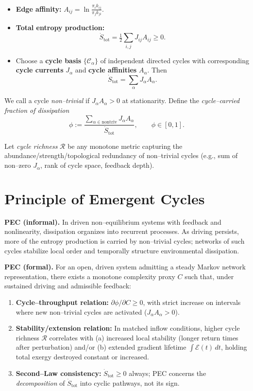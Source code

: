 \documentclass[12pt,a4paper]{article}
\begin{document}
\begin{itemize}
\item \textbf{Edge affinity:} $A_{ij} = \ln \frac{\pi_i k_{ij}}{\pi_j k_{ji}}$.
\item \textbf{Total entropy production:}
\[
\dot S_{\mathrm{tot}} = \tfrac{1}{2} \sum_{i,j} J_{ij} A_{ij} \ge 0.
\]
\item Choose a \textbf{cycle basis} $\{\mathcal{C}_\alpha\}$ of independent directed cycles with corresponding \textbf{cycle currents} $J_\alpha$ and \textbf{cycle affinities} $A_\alpha$. Then
\[
\dot S_{\mathrm{tot}} = \sum_{\alpha} J_\alpha A_\alpha.
\]
\end{itemize}

We call a cycle \emph{non--trivial} if $J_\alpha A_\alpha > 0$ at stationarity. Define the \emph{cycle--carried fraction of dissipation}
\[
\phi := \frac{\sum_{\alpha \in \mathrm{nontriv}} J_\alpha A_\alpha}{\dot S_{\mathrm{tot}}}, \qquad \phi \in [0,1].
\]

Let \emph{cycle richness} $\mathcal{R}$ be any monotone metric capturing the abundance/strength/topological redundancy of non--trivial cycles (e.g., sum of non--zero $J_\alpha$, rank of cycle space, feedback depth).

\section{Principle of Emergent Cycles}
\textbf{PEC (informal).} In driven non--equilibrium systems with feedback and nonlinearity, dissipation organizes into recurrent processes. As driving persists, more of the entropy production is carried by non--trivial cycles; networks of such cycles stabilize local order and temporally structure environmental dissipation.

\textbf{PEC (formal).} For an open, driven system admitting a steady Markov network representation, there exists a monotone complexity proxy $C$ such that, under sustained driving and admissible feedback:
\begin{enumerate}
\item \textbf{Cycle--throughput relation:} $\partial \phi / \partial C \ge 0$, with strict increase on intervals where new non--trivial cycles are activated ($J_\alpha A_\alpha > 0$).
\item \textbf{Stability/extension relation:} In matched inflow conditions, higher cycle richness $\mathcal{R}$ correlates with (a) increased local stability (longer return times after perturbation) and/or (b) extended gradient lifetime $\int \mathcal{E}(t)\,dt$, holding total exergy destroyed constant or increased.
\item \textbf{Second--Law consistency:} $\dot S_{\mathrm{tot}} \ge 0$ always; PEC concerns the \emph{decomposition} of $\dot S_{\mathrm{tot}}$ into cyclic pathways, not its sign.
\end{enumerate}
\end{document}
